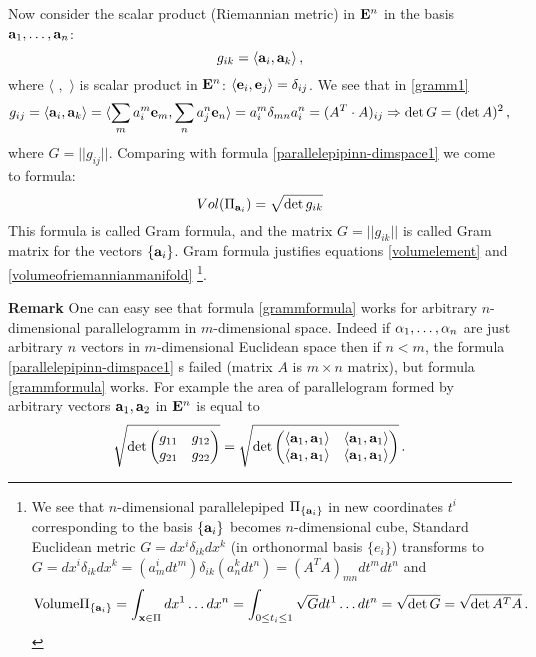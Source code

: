 \documentclass[12pt]{article}
\theoremstyle{theorem}
\numberwithin{equation}{section}
\begin{document}
 Now consider the scalar product (Riemannian metric) 
in ${\bf E}^n$
in the basis ${{\bf a}_1,\dots,{\bf a}_n}$:
        \begin{equation}\label{gramm1}
    g_{ik}=\langle{\bf a}_i,{\bf a}_k\rangle\,,
        \end{equation}
    where $\langle\,\,,\,\,\rangle$ is 
scalar product in ${\bf E}^n$:
   $\langle{\bf e}_i,{\bf e}_j\rangle=\delta_{ij}$.  We see that
in \eqref{gramm1}
             $$
  g_{ij}=\langle{\bf a}_i,{\bf a}_k\rangle=
\langle \sum _m a^m_i{\bf e}_m,\sum_n a^n_j{\bf e}_n\rangle=
      a^m_i\delta_{mn}a^n_i=(A^T\cdot A)_{ij}\Rightarrow \det G=(\det A)^2\,,
            $$                     
where $G=||g_{ij}||$. Comparing with formula 
\eqref{parallelepipinn-dimspace1}
we come to formula:
          \begin{equation}\label{grammformula}
           Vol(\Pi_{{\bf a}_i})=\sqrt{\det g_{ik}}
             \end{equation}
This formula is called Gram formula,
and   the matrix $G=||g_{ik}||$ is called 
Gram matrix for the vectors
$\{{\bf a}_i\}$.  Gram  formula justifies
equations \eqref{volumelement} and
 \eqref{volumeofriemannianmanifold}
\footnote{
  We see that  $n$-dimensional parallelepiped
    $\Pi_{\{{\bf a}_i\}}$ in new coordinates $t^i$
corresponding to the basis $\{{\bf a}_i\}$
 becomes $n$-dimensional cube,
  Standard Euclidean metric $G=dx^i\delta_{ik}dx^k$
(in orthonormal basis $\{e_i\}$) transforms to
       $
  G=dx^i\delta_{ik}dx^k=(a^i_m dt^m)\delta_{ik}(a^k_ndt^n)=(A^TA)_{mn}dt^mdt^n
       $
and 
       $$
{\rm Volume}\Pi_{\{{\bf a}_i\}}=\int_{{\bf x}\in \Pi}dx^1\dots dx^n=
       \int_{0\leq t_i\leq 1}\sqrt {G}dt^1\dots dt^n=
   \sqrt {\det G}=\sqrt{\det{A^TA}}\,.
       $$
}.

{\footnotesize
{\bf Remark} One can easy see that 
formula \eqref{grammformula}
works for arbitrary $n$-dimensional parallelogramm in $m$-dimensional space.
Indeed if ${\alpha_1,\dots,\alpha_n}$ are just arbitrary $n$ vectors
 in $m$-dimensional Euclidean space
 then if $n<m$, the formula \eqref{parallelepipinn-dimspace1} 
s failed (matrix $A$ is $m\times n$ matrix), but formula \eqref{grammformula}
works. For example the area  of parallelogram formed by arbitrary
vectors ${\bf a}_1,{\bf a}_2$ in ${\bf E}^n$ is equal to
           $$
        \sqrt{
 \det \begin{pmatrix}
    g_{11}& g_{12}\cr g_{21}& g_{22} 
          \end{pmatrix}
            }=
        \sqrt{
 \det \begin{pmatrix}
    \langle{\bf a}_1,{\bf a}_1\rangle&\langle{\bf a}_1,{\bf a}_1\rangle \cr
   \langle{\bf a}_1,{\bf a}_1\rangle &\langle{\bf a}_1,{\bf a}_1\rangle  
          \end{pmatrix}
            }\,.
           $$
}
\end{document}
